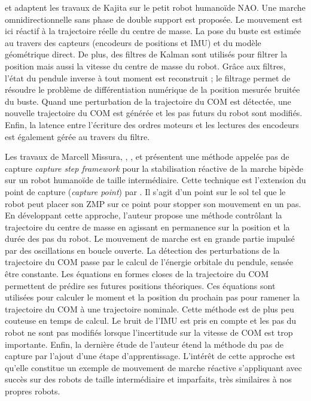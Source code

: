 \cite{graf_closed-loop_2010} et \cite{graf_center_2011} adaptent les travaux 
de Kajita sur le petit robot humanoïde NAO.
Une marche omnidirectionnelle sans phase de double support est proposée.
Le mouvement est ici réactif à la trajectoire réelle du centre de masse.
La pose du buste est estimée au travers des capteurs (encodeurs de positions et IMU)
et du modèle géométrique direct.
De plus, des filtres de Kalman sont utilisés pour filtrer la position mais 
aussi la vitesse du centre de masse du robot.
Grâce aux filtres, l'état du pendule inverse à tout moment est reconstruit ; 
le filtrage permet de résoudre le problème de différentiation numérique 
de la position mesurée bruitée du buste.
Quand une perturbation de la trajectoire du COM est détectée, une nouvelle
trajectoire du COM est générée et les pas futurs du robot sont modifiés.
Enfin, la latence entre l'écriture des ordres moteurs et les lectures
des encodeurs est également gérée au travers du filtre.

Les travaux de Marcell Missura, \cite{missura_lateral_2011}, \cite{missura_omnidirectional_2013},
\cite{missura_learning_2014} et \cite{missura_analytic_2016} présentent une méthode
appelée \og pas de capture \fg \textit{capture step framework} pour la stabilisation
réactive de la marche bipède sur un robot humanoïde de taille intermédiaire.
Cette technique est l'extension du \og point de capture \fg 
(\textit{capture point}) par \cite{pratt_capture_2006}.
Il s'agit d'un point sur le sol tel que le robot peut placer son ZMP sur ce point
pour stopper son mouvement en un pas.
En développant cette approche, l'auteur propose une méthode contrôlant
la trajectoire du centre de masse en agissant en permanence sur 
la position et la durée des pas du robot.
Le mouvement de marche est en grande partie impulsé par des oscillations 
en boucle ouverte.
La détection des perturbations de la trajectoire du COM
passe par le calcul de l'énergie orbitale du pendule, sensée être constante.
Les équations en formes closes de la trajectoire du COM permettent de prédire
ses futures positions théoriques.
Ces équations sont utilisées pour calculer le moment et la position du prochain
pas pour ramener la trajectoire du COM à une trajectoire nominale.
Cette méthode est de plus peu couteuse en temps de calcul.
Le bruit de l'IMU est pris en compte et les pas du robot ne sont pas
modifiés lorsque l'incertitude sur la vitesse de COM est trop importante.
Enfin, la dernière étude de l'auteur étend la méthode du pas de capture par l'ajout
d'une étape d'apprentissage.
L'intérêt de cette approche est qu'elle constitue un exemple
de mouvement de marche réactive s'appliquant avec succès sur 
des robots de taille intermédiaire et imparfaits, très similaires à nos propres robots.

